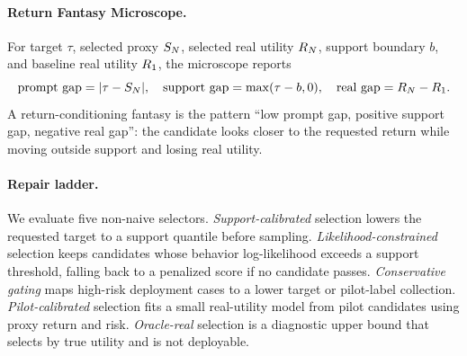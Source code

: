 \paragraph{Return Fantasy Microscope.}
For target $\tau$, selected proxy $S_N$, selected real utility $R_N$, support boundary $b$, and baseline real utility $R_1$, the microscope reports
\[
  \text{prompt gap}=|\tau-S_N|,\quad
  \text{support gap}=\max(\tau-b,0),\quad
  \text{real gap}=R_N-R_1.
\]
A return-conditioning fantasy is the pattern ``low prompt gap, positive support gap, negative real gap'': the candidate looks closer to the requested return while moving outside support and losing real utility.

\paragraph{Repair ladder.}
We evaluate five non-naive selectors. \emph{Support-calibrated} selection lowers the requested target to a support quantile before sampling. \emph{Likelihood-constrained} selection keeps candidates whose behavior log-likelihood exceeds a support threshold, falling back to a penalized score if no candidate passes. \emph{Conservative gating} maps high-risk deployment cases to a lower target or pilot-label collection. \emph{Pilot-calibrated} selection fits a small real-utility model from pilot candidates using proxy return and risk. \emph{Oracle-real} selection is a diagnostic upper bound that selects by true utility and is not deployable.
